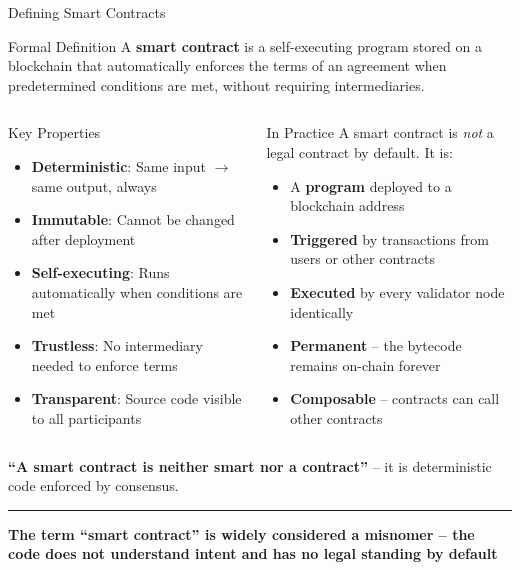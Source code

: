\documentclass[8pt,aspectratio=169]{beamer}
\newcommand{\bottomnote}[1]{\vfill\vspace{-2mm}\textcolor{mllavender2}{\rule{\textwidth}{0.4pt}}\vspace{1mm}\footnotesize\textbf{#1}}
\begin{document}
\begin{frame}{Defining Smart Contracts}
\begin{block}{Formal Definition}
A \textbf{smart contract} is a self-executing program stored on a blockchain that automatically enforces the terms of an agreement when predetermined conditions are met, without requiring intermediaries.
\end{block}
\vspace{3mm}
\begin{columns}[T]
\begin{block}{Key Properties}
\footnotesize
\begin{itemize}
  \item \textbf{Deterministic}: Same input $\rightarrow$ same output, always
  \item \textbf{Immutable}: Cannot be changed after deployment
  \item \textbf{Self-executing}: Runs automatically when conditions are met
  \item \textbf{Trustless}: No intermediary needed to enforce terms
  \item \textbf{Transparent}: Source code visible to all participants
\end{itemize}
\end{block}

\begin{exampleblock}{In Practice}
\footnotesize
A smart contract is \emph{not} a legal contract by default. It is:
\begin{itemize}
  \item A \textbf{program} deployed to a blockchain address
  \item \textbf{Triggered} by transactions from users or other contracts
  \item \textbf{Executed} by every validator node identically
  \item \textbf{Permanent} -- the bytecode remains on-chain forever
  \item \textbf{Composable} -- contracts can call other contracts
\end{itemize}
\end{exampleblock}
\end{columns}
\vspace{2mm}
\centering
\textcolor{mlpurple}{\textbf{``A smart contract is neither smart nor a contract''}} -- it is deterministic code enforced by consensus.
\bottomnote{The term ``smart contract'' is widely considered a misnomer -- the code does not understand intent and has no legal standing by default}
\end{frame}
\end{document}
